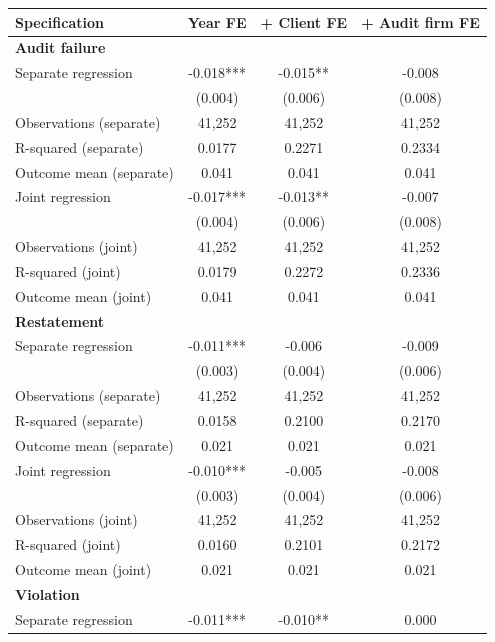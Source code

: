 \documentclass[10pt]{article}
\begin{document}
\begin{minipage}{19cm}\fontsize{10}{12}\selectfont\setlength{\tabcolsep}{4pt}\renewcommand{\arraystretch}{1.12}


\centering
{}
\begin{threeparttable}
\begin{tabular}{p{}ccc}
\toprule
Specification & Year FE & + Client FE & + Audit firm FE \\
\midrule
\multicolumn{4}{l}{\textbf{Audit failure}} \\
Separate regression & -0.018*** & -0.015** & -0.008 \\
 & (0.004) & (0.006) & (0.008) \\
Observations (separate) & 41,252 & 41,252 & 41,252 \\
R-squared (separate) & 0.0177 & 0.2271 & 0.2334 \\
Outcome mean (separate) & 0.041 & 0.041 & 0.041 \\
Joint regression & -0.017*** & -0.013** & -0.007 \\
 & (0.004) & (0.006) & (0.008) \\
Observations (joint) & 41,252 & 41,252 & 41,252 \\
R-squared (joint) & 0.0179 & 0.2272 & 0.2336 \\
Outcome mean (joint) & 0.041 & 0.041 & 0.041 \\
\multicolumn{4}{l}{\textbf{Restatement}} \\
Separate regression & -0.011*** & -0.006 & -0.009 \\
 & (0.003) & (0.004) & (0.006) \\
Observations (separate) & 41,252 & 41,252 & 41,252 \\
R-squared (separate) & 0.0158 & 0.2100 & 0.2170 \\
Outcome mean (separate) & 0.021 & 0.021 & 0.021 \\
Joint regression & -0.010*** & -0.005 & -0.008 \\
 & (0.003) & (0.004) & (0.006) \\
Observations (joint) & 41,252 & 41,252 & 41,252 \\
R-squared (joint) & 0.0160 & 0.2101 & 0.2172 \\
Outcome mean (joint) & 0.021 & 0.021 & 0.021 \\
\multicolumn{4}{l}{\textbf{Violation}} \\
Separate regression & -0.011*** & -0.010** & 0.000 \\

\end{tabular}
\end{threeparttable}
\end{minipage}
\end{document}
